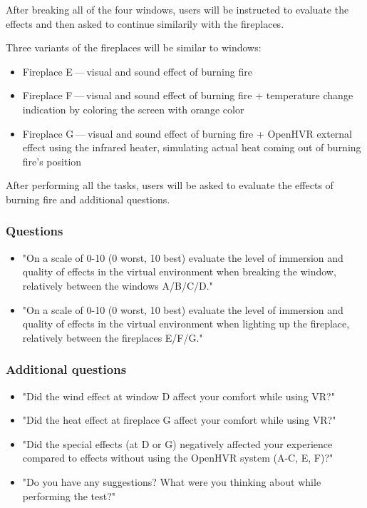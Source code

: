 After breaking all of the four windows, users will be instructed to evaluate
the effects and then asked to continue similarily with the fireplaces.


Three variants of the fireplaces will be similar to windows:


\begin{itemize}

\item Fireplace E — visual and sound effect of burning fire

\item Fireplace F — visual and sound effect of burning fire + temperature change
indication by coloring the screen with orange color

\item Fireplace G — visual and sound effect of burning fire + OpenHVR
external effect using the infrared heater, simulating actual heat coming
out of burning fire’s position

\end{itemize}


After performing all the tasks, users will be asked to evaluate the
effects of burning fire and additional questions.


\hypertarget{x-questions}{\subsubsection*{Questions}}
\begin{itemize}

\item "On a scale of 0-10 (0 worst, 10 best) evaluate the level of immersion and quality
of effects in the virtual environment when breaking the window, relatively
between the windows A/B/C/D."

\item "On a scale of 0-10 (0 worst, 10 best) evaluate the level of immersion and quality
of effects in the virtual environment when lighting up the fireplace, relatively
between the fireplaces E/F/G."

\end{itemize}


\hypertarget{x-additional-questions}{\subsubsection*{Additional questions}}
\begin{itemize}

\item "Did the wind effect at window D affect your comfort while using VR?"

\item "Did the heat effect at fireplace G affect your comfort while using VR?"

\item "Did the special effects (at D or G) negatively affected your experience
compared to effects without using the OpenHVR system (A-C, E, F)?"

\item "Do you have any suggestions? What were you thinking about while performing
the test?"

\end{itemize}


